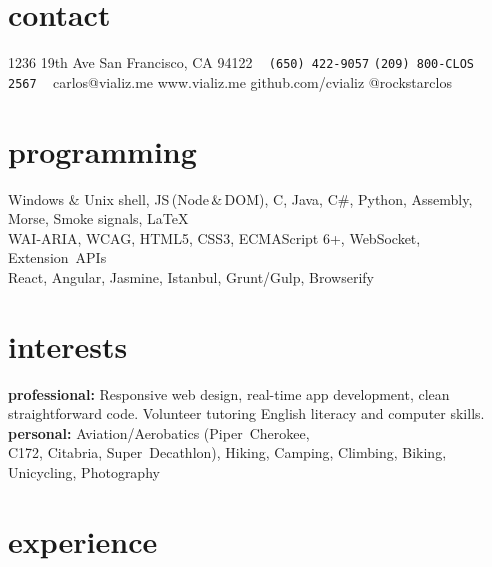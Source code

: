 \documentclass[]{cv-style}          %
\begin{document}
\lastupdated


\begin{aside}
%
\section{contact}
1236 19th Ave
San Francisco, CA 94122
~
\texttt{\color{gray}(650) 422-9057}
\texttt{\color{gray}(209) 800-CLOS}
\texttt{\color{gray}          2567}
~
carlos@vializ.me
www.vializ.me
github.com/cvializ
@rockstarclos
%
\section{programming}
Windows \& Unix shell, JS\,(Node\,\&\,DOM), C, Java, C\#, Python, Assembly, Morse, Smoke signals, \LaTeX{}%
\\[\baselineskip]%
WAI-ARIA, WCAG, HTML5, CSS3, ECMAScript 6+, WebSocket, {Extension~APIs}%
\\[\baselineskip]%
React, Angular, Jasmine, Istanbul, Grunt/Gulp, Browserify%
%
\section{interests}
\textbf{professional:} Responsive web design, real-time app development, clean straightforward code. Volunteer tutoring English literacy and computer skills.
\textbf{personal:} Aviation/Aerobatics ({Piper~Cherokee},\\{C172}, Citabria, {Super~Decathlon}), Hiking, Camping, Climbing, Biking, Unicycling, Photography
%
\end{aside}


\section{experience}
\end{document}
